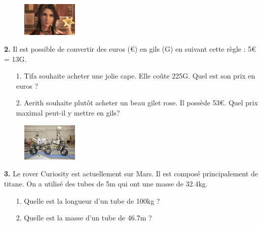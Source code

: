 \begin{minipage}[t]{0.25\textwidth}
  \begin{figure}[H]
    \centering
    \includegraphics[width=100px]{4x2-proportionnalite/ex2.jpg}
  \end{figure}
\end{minipage}
\begin{minipage}[t]{0.75\textwidth}
\textbf{2.} Il est possible de convertir des euros (€) en gils (G) en suivant cette règle : 5€ = 13G.

\begin{enumerate}
  \item[1.] Tifa souhaite acheter une jolie cape. Elle coûte 225G. Quel est son prix en euros ? 
  \item[2.] Aerith souhaite plutôt acheter un beau gilet rose. Il possède 53€. Quel prix maximal peut-il y mettre en gils?
\end{enumerate}

\Pointilles[1]
\end{minipage}

\Pointilles[7]

\begin{minipage}[t]{0.25\textwidth}
  \begin{figure}[H]
    \centering
    \includegraphics[width=100px]{4x2-proportionnalite/ex3.jpg}
  \end{figure}
\end{minipage}
\begin{minipage}[t]{0.75\textwidth}
\textbf{3.} Le rover Curiosity est actuellement sur Mars. Il est composé principalement de titane. On a utilisé des tubes de 5m qui ont une masse de 32.4kg. 

\begin{enumerate}
  \item[1.] Quelle est la longueur d'un tube de 100kg ?
  \item[2.] Quelle est la masse d'un tube de 46.7m ? 
\end{enumerate}

\Pointilles[3]
\end{minipage}


